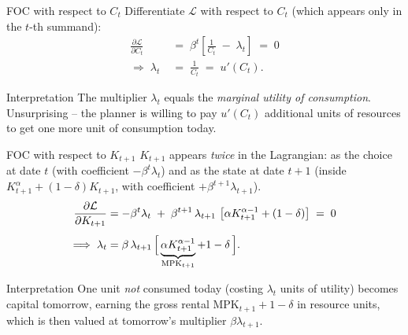 \documentclass[aspectratio=169,11pt]{beamer}
\begin{document}
\begin{frame}{FOC with respect to $C_t$}
\small Differentiate $\mathcal{L}$ with respect to $C_t$ (which appears only in the $t$-th summand):
\begin{align*}
\frac{\partial \mathcal{L}}{\partial C_t} \;&=\; \beta^t \left[\frac{1}{C_t} \;-\; \lambda_t\right] \;=\; 0 \\[4pt]
\Longrightarrow\; \lambda_t \;&=\; \frac{1}{C_t} \;=\; u'(C_t).
\end{align*}
\begin{block}{Interpretation}
\small
The multiplier $\lambda_t$ equals the \emph{marginal utility of consumption}. Unsurprising -- the planner is willing to pay $u'(C_t)$ additional units of resources to get one more unit of consumption today.
\end{block}
\end{frame}

\begin{frame}{FOC with respect to $K_{t+1}$}
\small $K_{t+1}$ appears \emph{twice} in the Lagrangian: as the choice at date $t$ (with coefficient $-\beta^t \lambda_t$) and as the state at date $t+1$ (inside $K_{t+1}^\alpha + (1-\delta)K_{t+1}$, with coefficient $+\beta^{t+1}\lambda_{t+1}$).
\begin{align*}
\frac{\partial \mathcal{L}}{\partial K_{t+1}}
&= -\beta^t \lambda_t \;+\; \beta^{t+1}\,\lambda_{t+1}\,\left[\alpha K_{t+1}^{\alpha-1} + (1-\delta)\right] \;=\; 0 \\[4pt]
\Longrightarrow\; \lambda_t &= \beta\,\lambda_{t+1}\,\Bigl[\,\underbrace{\alpha K_{t+1}^{\alpha-1}}_{\text{MPK}_{t+1}} + 1 - \delta\,\Bigr].
\end{align*}
\begin{block}{Interpretation}
\small
One unit \emph{not} consumed today (costing $\lambda_t$ units of utility) becomes capital tomorrow, earning the gross rental $\mathrm{MPK}_{t+1} + 1-\delta$ in resource units, which is then valued at tomorrow's multiplier $\beta\lambda_{t+1}$.
\end{block}
\end{frame}
\end{document}
